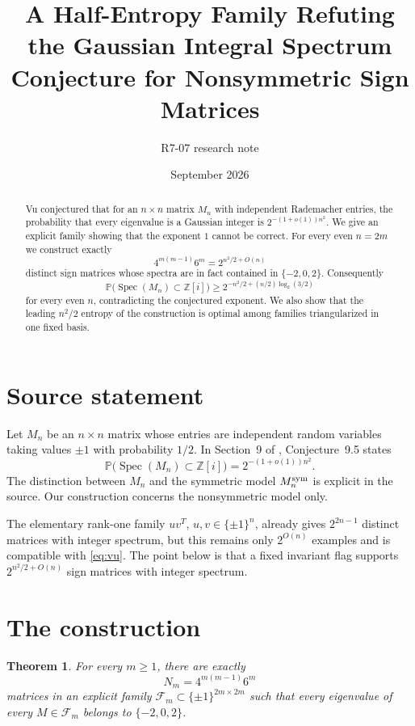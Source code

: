 \documentclass[11pt]{article}
\title{A Half-Entropy Family Refuting the Gaussian Integral Spectrum Conjecture for Nonsymmetric Sign Matrices}
\author{R7-07 research note}
\date{September 2026}
\newtheorem{theorem}{Theorem}
\begin{document}
\maketitle

\begin{abstract}
Vu conjectured that for an $n\times n$ matrix $M_n$ with independent Rademacher entries, the probability that every eigenvalue is a Gaussian integer is $2^{-(1+o(1))n^2}$.  We give an explicit family showing that the exponent $1$ cannot be correct.  For every even $n=2m$ we construct exactly
\[
4^{m(m-1)}6^m=2^{n^2/2+O(n)}
\]
distinct sign matrices whose spectra are in fact contained in $\{-2,0,2\}$.  Consequently
\[
\mathbb P\bigl(\operatorname{Spec}(M_n)\subset\mathbb Z[i]\bigr)
\ge 2^{-n^2/2+(n/2)\log_2(3/2)}
\]
for every even $n$, contradicting the conjectured exponent.  We also show that the leading $n^2/2$ entropy of the construction is optimal among families triangularized in one fixed basis.
\end{abstract}

\section{Source statement}
Let $M_n$ be an $n\times n$ matrix whose entries are independent random variables taking values $\pm1$ with probability $1/2$.  In Section~9 of \cite{Vu2021}, Conjecture~9.5 states
\begin{equation}\label{eq:vu}
\mathbb P\bigl(\operatorname{Spec}(M_n)\subset\mathbb Z[i]\bigr)
=2^{-(1+o(1))n^2}.
\end{equation}
The distinction between $M_n$ and the symmetric model $M_n^{\rm sym}$ is explicit in the source.  Our construction concerns the nonsymmetric model only.

The elementary rank-one family $uv^T$, $u,v\in\{\pm1\}^n$, already gives $2^{2n-1}$ distinct matrices with integer spectrum, but this remains only $2^{O(n)}$ examples and is compatible with \eqref{eq:vu}.  The point below is that a fixed invariant flag supports $2^{n^2/2+O(n)}$ sign matrices with integer spectrum.

\section{The construction}
\begin{theorem}\label{thm:main}
For every $m\ge1$, there are exactly
\[
N_m=4^{m(m-1)}6^m
\]
matrices in an explicit family $\mathcal F_m\subset\{\pm1\}^{2m\times2m}$ such that every eigenvalue of every $M\in\mathcal F_m$ belongs to $\{-2,0,2\}$.
\end{theorem}
\end{document}
